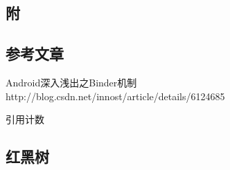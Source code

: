 \documentclass[a4paper,11pt]{article}
\begin{document}
\begin{CJK*}{UTF8}{gbsn}
\section{附}
    \subsection{参考文章}
    \begin{description}
        \item Android深入浅出之Binder机制 \\http://blog.csdn.net/innost/article/details/6124685
        \item 引用计数
    \end{description}
    \subsection{红黑树}
\end{CJK*} %
\end{document}
